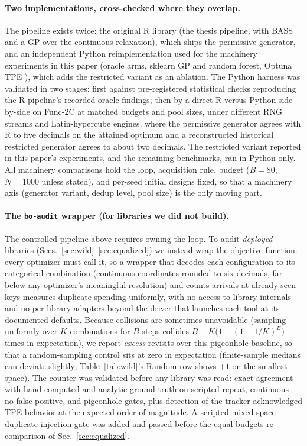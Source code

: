 \documentclass[%
 aip,
 amsmath,amssymb,
 floatfix,
 reprint,%
]{revtex4-1}
\begin{document}
\paragraph{Two implementations, cross-checked where they overlap.}
The pipeline exists twice: the original R library (the thesis pipeline,
with BASS \cite{francom2020bass} and a GP over the continuous
relaxation), which ships the permissive generator, and an independent
Python reimplementation used for the machinery experiments in this paper
(oracle arms, sklearn GP and random forest, Optuna TPE
\cite{akiba2019optuna}), which adds the restricted variant as an
ablation. The Python harness was validated in two stages: first against
pre-registered statistical checks reproducing the R pipeline's recorded
oracle findings; then by a direct R-versus-Python side-by-side on
Func-2C at matched budgets and pool sizes, under different RNG streams
and Latin-hypercube engines, where the permissive generator agrees with
R to five decimals on the attained optimum and a reconstructed
historical restricted generator agrees to about two decimals. The
restricted variant reported in this paper's experiments, and the
remaining benchmarks, ran in Python only. All machinery comparisons hold
the loop, acquisition rule, budget ($B = 80$, $N = 1000$ unless stated),
and per-seed initial designs fixed, so that a machinery axis (generator
variant, dedup level, pool size) is the only moving part.

\paragraph{The \texttt{bo-audit} wrapper (for libraries we did not build).}
The controlled pipeline above requires owning the loop. To audit
\emph{deployed} libraries (Secs.~\ref{sec:wild}--\ref{sec:equalized}) we
instead wrap the objective function: every optimizer must call it, so a
wrapper that decodes each configuration to its categorical combination
(continuous coordinates rounded to six decimals, far below any
optimizer's meaningful resolution) and counts arrivals at already-seen
keys measures duplicate spending uniformly, with no access to library
internals and no per-library adapters beyond the driver that launches
each tool at its documented defaults. Because collisions are sometimes
unavoidable (sampling uniformly over $K$ combinations for $B$ steps
collides $B - K\bigl(1-(1-1/K)^{B}\bigr)$ times in expectation), we
report \emph{excess} revisits over this pigeonhole baseline, so that a
random-sampling control sits at zero in expectation (finite-sample
medians can deviate slightly; Table~\ref{tab:wild}'s Random row shows
$+1$ on the smallest space). The counter was validated before any
library was read: exact agreement with hand-computed and analytic
ground truth on scripted-repeat, continuous no-false-positive, and
pigeonhole gates, plus detection of the tracker-acknowledged TPE
behavior at the expected order of magnitude. A scripted
mixed-space duplicate-injection gate was added and passed before the
equal-budgets re-comparison of Sec.~\ref{sec:equalized}.
\end{document}
